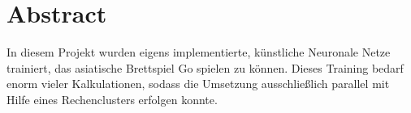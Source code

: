 \section*{Abstract}
In diesem Projekt wurden eigens implementierte, künstliche Neuronale Netze trainiert, das asiatische Brettspiel Go spielen zu können. Dieses Training bedarf enorm vieler Kalkulationen, sodass die Umsetzung ausschließlich parallel mit Hilfe eines Rechenclusters erfolgen konnte.